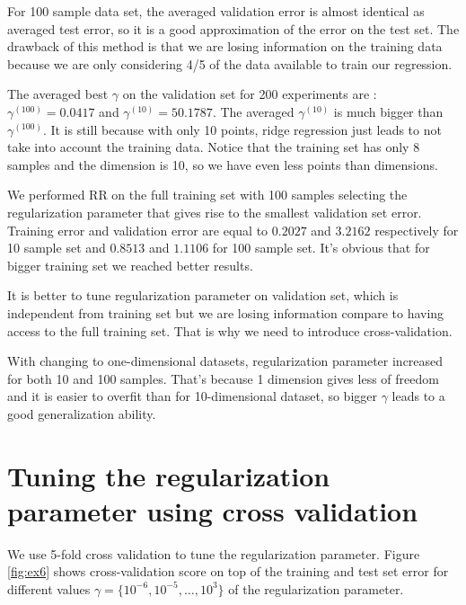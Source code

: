 \documentclass{article} %
\begin{document}
For 100 sample data set, the averaged validation error is almost identical as averaged test error, so it is a good approximation of the error on the test set. The drawback of this method is that we are losing information on the training data because we are only considering 4/5 of the data available to train our regression. 

The averaged best $\gamma$ on the validation set for 200 experiments are : $\gamma^{(100)} = 0.0417 $ and  $\gamma^{(10)} = 50.1787$. The averaged  $\gamma^{(10)}$ is much bigger than  $\gamma^{(100)}$. It is still because with only 10 points, ridge regression just leads to not take into account the training data. Notice that the training set has only 8 samples and the dimension is 10, so we have even less points than dimensions.

We performed RR on the full training set with 100 samples selecting the regularization parameter that gives rise to the smallest validation set error. Training error and validation error are equal to $0.2027$ and $3.2162$ respectively for 10 sample set and   $0.8513$ and $1.1106$  for 100 sample set. It's obvious that for bigger training set we reached better results.

It is better to tune regularization parameter on validation set, which is independent from training set but we are losing information compare to having access to the full training set. That is why we need to introduce cross-validation. 

With changing to one-dimensional datasets, regularization parameter increased for both 10 and 100 samples. That's because 1 dimension gives less of freedom  and it is easier to overfit than for 10-dimensional dataset, so bigger $\gamma$ leads to a good generalization ability.

\section{Tuning the regularization parameter using cross validation}
We use 5-fold cross validation to tune the regularization parameter. Figure \ref{fig:ex6} shows cross-validation score on top of the training and test set error for different values $\gamma = \{10^{-6}, 10^{-5}, \dots, 10^3 \}$ of the regularization parameter.
\end{document}
